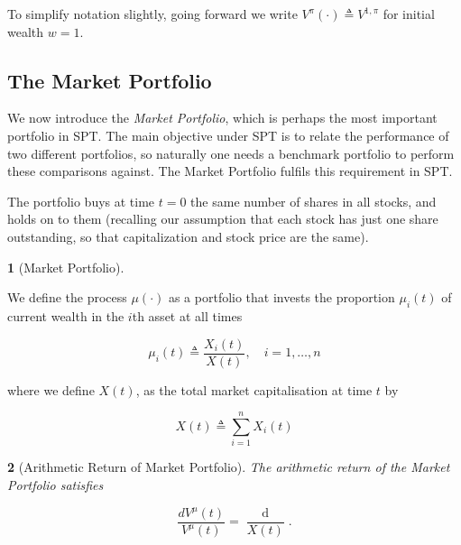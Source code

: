 \documentclass[british]{amsart} \usepackage{lmodern}
\numberwithin{equation}{section} \numberwithin{figure}{section}
\theoremstyle{plain} \newtheorem{thm}{\protect\theoremname}[section]
\theoremstyle{definition} \newtheorem{defn}[thm]{\protect\definitionname}
\theoremstyle{plain} \newtheorem{assumption}[thm]{\protect\assumptionname}
\theoremstyle{plain} \newtheorem{lem}[thm]{\protect\lemmaname}
\theoremstyle{plain} \newtheorem{prop}[thm]{\protect\propositionname}
\theoremstyle{remark} \newtheorem{rem}[thm]{\protect\remarkname}
\theoremstyle{plain} \newtheorem{cor}[thm]{\protect\corollaryname}
\renewcommand{\d}[1]{\mathop{\mathrm{d}{#1}}}
\newcommand{\defeq}{\mathop{\triangleq}} \newcommand{\almostsurely}{\text{a.s.}}
\newcommand{\rangei}{i=1,\dots,n} \newcommand{\measure}{\mathbb{P}}
\newcommand{\Vmu}{V^{\mu}}
\begin{document}
To simplify notation slightly, going forward we write $V^{\pi}(\cdot) \defeq V^{1,\pi}$ for initial wealth $w=1$.

\newpage
\subsection{The Market Portfolio}

We now introduce the \textit{Market Portfolio}, which is perhaps the most
important portfolio in SPT. The main objective under SPT is to relate the 
performance of two different portfolios, so naturally one needs a 
benchmark portfolio to perform these comparisons against. The Market Portfolio
fulfils this requirement in SPT.

The portfolio buys at time $t=0$ the same number of shares in all stocks, and
holds on to them (recalling our assumption that each stock has just one share
outstanding, so that capitalization and stock price are the same).

\begin{defn} [Market Portfolio] 
  \label{def:marketportfolio}

  We define the process $\mu(\cdot)$ as a portfolio that invests the proportion
  $\mu_{i}(t)$ of current wealth in the $i$th asset at all times

  \begin{equation} 
    \label{eq:marketportfolio} 
      \mu_{i}(t) \defeq \frac{X_{i}(t)}{X(t)}, 
    \quad 
    \rangei 
  \end{equation}

  where we define $X(t)$, as the total market capitalisation at time $t$ by

  \begin{equation} 
    \label{eq:totalmarketcapitalisation} 
      X(t) \defeq \sum_{i=1}^{n} X_{i}(t) 
  \end{equation}

\end{defn}

\begin{prop} [Arithmetic Return of Market Portfolio]

  The arithmetic return of the Market Portfolio satisfies

  \begin{equation} 
    \label{eq:arithmeticreturnofmarketportfolio}
      \frac{d{\Vmu}(t)}{\Vmu(t)} = \frac{\d{X(t)}}{X(t)}.
  \end{equation}

\end{prop}
\end{document}
